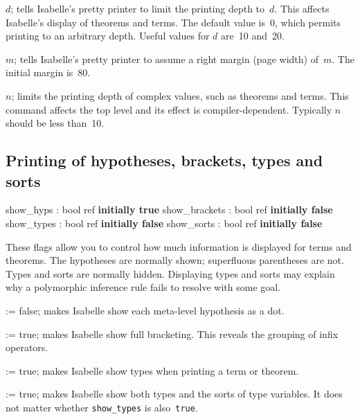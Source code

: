 \begin{ttdescription}
\item[\ttindexbold{Pretty.setdepth} \(d\);]  
  tells Isabelle's pretty printer to limit the printing depth to~$d$.  This
  affects Isabelle's display of theorems and terms.  The default value
  is~0, which permits printing to an arbitrary depth.  Useful values for
  $d$ are~10 and~20.

\item[\ttindexbold{Pretty.setmargin} \(m\);]  
  tells Isabelle's pretty printer to assume a right margin (page width)
  of~$m$.  The initial margin is~80.

\item[\ttindexbold{print_depth} \(n\);]  
  limits the printing depth of complex \ML{} values, such as theorems and
  terms.  This command affects the \ML{} top level and its effect is
  compiler-dependent.  Typically $n$ should be less than~10.
\end{ttdescription}


\subsection{Printing of hypotheses, brackets, types and sorts}
\begin{ttbox} 
show_hyps     : bool ref \hfill{\bf initially true}
show_brackets : bool ref \hfill{\bf initially false}
show_types    : bool ref \hfill{\bf initially false}
show_sorts    : bool ref \hfill{\bf initially false}
\end{ttbox}
These flags allow you to control how much information is displayed for
terms and theorems.  The hypotheses are normally shown; superfluous
parentheses are not.  Types and sorts are normally hidden.  Displaying
types and sorts may explain why a polymorphic inference rule fails to
resolve with some goal.

\begin{ttdescription}
\item[\ttindexbold{show_hyps} := false;]   
makes Isabelle show each meta-level hypothesis as a dot.

\item[\ttindexbold{show_brackets} := true;] 
  makes Isabelle show full bracketing.  This reveals the
  grouping of infix operators.

\item[\ttindexbold{show_types} := true;]
makes Isabelle show types when printing a term or theorem.

\item[\ttindexbold{show_sorts} := true;]
makes Isabelle show both types and the sorts of type variables.  It does not
matter whether {\tt show_types} is also~{\tt true}. 
\end{ttdescription}


